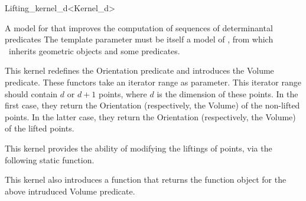 \begin{ccRefClass}{Lifting_kernel_d<Kernel_d>}


\ccDefinition
A model for  that improves the computation of sequences of
determinantal predicates The template parameter must be itself a model of
, from which \ccRefName~inherits geometric objects and some
predicates.

\ccIsModel
{}





This kernel redefines the Orientation predicate and introduces the Volume
predicate. These functors take an iterator range as parameter. This
iterator range should contain \(d\) or \(d+1\) points, where \(d\) is the
dimension of these points. In the first case, they return the Orientation
(respectively, the Volume) of the non-lifted points. In the latter case,
they return the Orientation (respectively, the Volume) of the lifted
points.

\ccGlue
{}

\ccOperations

This kernel provides the ability of modifying the liftings of points, via
the following static function.


This kernel also introduces a function that returns the function object for the
above intruduced Volume predicate.


\end{ccRefClass}
